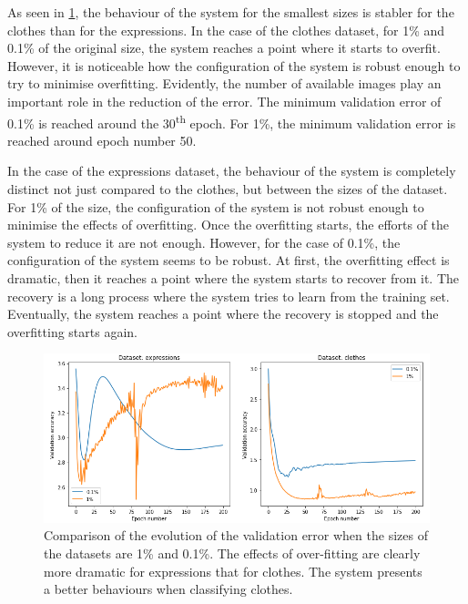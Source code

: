 \documentclass{article}
\begin{document}
As seen in \ref{fig:tf_beh}, the behaviour of the system for the smallest sizes is stabler for the clothes than for the expressions. In the case of the clothes dataset, for 1\% and 0.1\% of the original size, the system reaches a point where it starts to overfit. However, it is noticeable how the configuration of the system is robust enough to try to minimise overfitting. Evidently, the number of available images play an important role in the reduction of the error. The minimum validation error of 0.1\% is reached around the 30\textsuperscript{th} epoch. For 1\%, the minimum validation error is reached around epoch number 50.

In the case of the expressions dataset, the behaviour of the system is completely distinct not just compared to the clothes, but between the sizes of the dataset. For 1\% of the size, the configuration of the system is not robust enough to minimise the effects of overfitting. Once the overfitting starts, the efforts of the system to reduce it are not enough. However, for the case of 0.1\%, the configuration of the system seems to be robust.  At first, the overfitting effect is dramatic, then it reaches a point where the system starts to recover from it. The recovery is a long process where the system tries to learn from the training set. Eventually, the system reaches a point where the recovery is stopped and the overfitting starts again.

\begin{figure}[tb]
    \vskip 5mm
        \begin{center}
            \includegraphics[scale=0.375]{behaviour_rotated.png}
            \caption{Comparison of the evolution of the validation error when the sizes of the datasets are 1\% and 0.1\%. The effects of over-fitting are clearly more dramatic for expressions that for clothes. The system presents a better behaviours when classifying clothes. }
            \label{fig:tf_beh}
        \end{center}
    \vskip -5mm
\end{figure}
\end{document}
